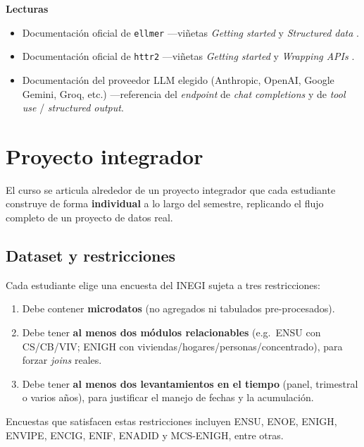 \documentclass[11pt,letterpaper]{article}
\newcommand{\blue}[1]{{\color{cerulean}#1}}
\begin{document}
\medskip
\noindent\textbf{Lecturas}
\begin{itemize}[leftmargin=*, itemsep=1pt]
    \item Documentación oficial de \texttt{ellmer} ---viñetas \textit{Getting started} y \textit{Structured data} \cite{wickham-ellmer}.
    \item Documentación oficial de \texttt{httr2} ---viñetas \textit{Getting started} y \textit{Wrapping APIs} \cite{wickham-httr2}.
    \item Documentación del proveedor LLM elegido (Anthropic, OpenAI, Google Gemini, Groq, etc.) ---referencia del \textit{endpoint} de \textit{chat completions} y de \textit{tool use} / \textit{structured output}.
\end{itemize}

\section{Proyecto integrador}

El curso se articula alrededor de un \blue{proyecto integrador} que cada estudiante construye de forma \textbf{individual} a lo largo del semestre, replicando el flujo completo de un proyecto de datos real.

\subsection*{Dataset y restricciones}

Cada estudiante elige una encuesta del \blue{INEGI} sujeta a tres restricciones:

\begin{enumerate}[leftmargin=*, itemsep=1pt]
    \item Debe contener \textbf{microdatos} (no agregados ni tabulados pre-procesados).
    \item Debe tener \textbf{al menos dos módulos relacionables} (e.g.\ ENSU con CS/CB/VIV; ENIGH con viviendas/hogares/personas/concentrado), para forzar \textit{joins} reales.
    \item Debe tener \textbf{al menos dos levantamientos en el tiempo} (panel, trimestral o varios años), para justificar el manejo de fechas y la acumulación.
\end{enumerate}

Encuestas que satisfacen estas restricciones incluyen ENSU, ENOE, ENIGH, ENVIPE, ENCIG, ENIF, ENADID y MCS-ENIGH, entre otras.
\end{document}
